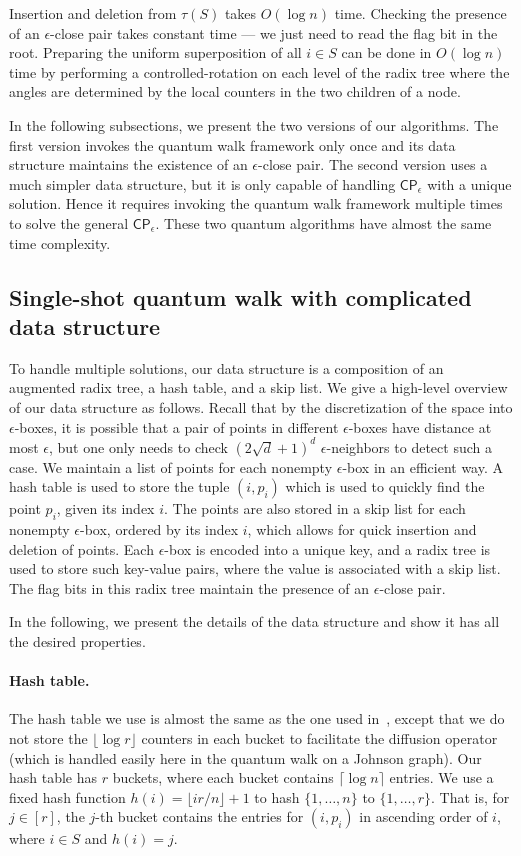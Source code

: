 \documentclass[10pt,a4paper]{article}
\newcommand{\ceil}[1]{\lceil #1 \rceil}
\newcommand{\floor}[1]{\lfloor #1 \rfloor}
\newcommand{\eCP}{\mathsf{CP}_{\epsilon}}
\begin{document}
Insertion and deletion from $\tau(S)$ takes $O(\log n)$ time. Checking the presence of an $\epsilon$-close pair takes constant time --- we just need to read the flag bit in the root. Preparing the uniform superposition of all $i \in S$ can be done in $O(\log n)$ time by performing a controlled-rotation on each level of the radix tree where the angles are determined by the local counters in the two children of a node.

In the following subsections, we present the two versions of our algorithms. The first version invokes the quantum walk framework only once and its data structure maintains the existence of an $\epsilon$-close pair. The second version uses a much simpler data structure, but it is only capable of handling $\eCP$ with a unique solution. Hence it requires invoking the quantum walk framework multiple times to solve the general $\eCP$. These two quantum algorithms have almost the same time complexity. 

\subsection{Single-shot quantum walk with complicated data structure}
\label{sec:one-shot}
To handle multiple solutions, our data structure is a composition of an augmented radix tree, a hash table, and a skip list. We give a high-level overview of our data structure as follows. Recall that by the discretization of the space into $\epsilon$-boxes,  it is possible that a pair of points in different $\epsilon$-boxes have distance at most $\epsilon$, but one only needs to check $(2\sqrt{d}+1)^d$ $\epsilon$-neighbors to detect such a case. We maintain a list of points for each nonempty $\epsilon$-box in an efficient way. A hash table is used to store the tuple $(i, p_i)$ which is used to quickly find the point $p_i$, given its index $i$. The points are also stored in a skip list for each nonempty $\epsilon$-box, ordered by its index $i$, which allows for quick insertion and deletion of points. Each $\epsilon$-box is encoded into a unique key, and a radix tree is used to store such key-value pairs, where the value is associated with a skip list. The flag bits in this radix tree maintain the presence of an $\epsilon$-close pair.

In the following, we present the details of the data structure and show it has all the desired properties.

\paragraph{Hash table.}
The hash table we use is almost the same as the one used in~\cite{r5}, except that we do not store the $\floor{\log r}$ counters in each bucket to facilitate the diffusion operator (which is handled easily here in the quantum walk on a Johnson graph). Our hash table has $r$ buckets, where each bucket contains $\ceil{\log n}$ entries. We use a fixed hash function $h(i) = \floor{ir/n}+1$ to hash $\{1, \ldots, n\}$ to $\{1, \ldots, r\}$. That is, for $j\in [r]$, the $j$-th bucket contains the entries for $(i, p_i)$ in ascending order of $i$, where $i \in S$ and $h(i) = j$. 
\end{document}
